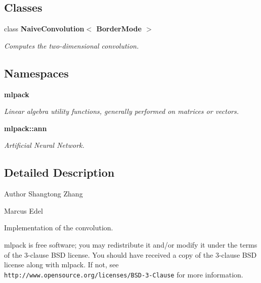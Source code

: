 \subsection*{Classes}
\begin{DoxyCompactItemize}
\item 
class \textbf{ Naive\+Convolution$<$ Border\+Mode $>$}
\begin{DoxyCompactList}\small\item\em Computes the two-\/dimensional convolution. \end{DoxyCompactList}\end{DoxyCompactItemize}
\subsection*{Namespaces}
\begin{DoxyCompactItemize}
\item 
 \textbf{ mlpack}
\begin{DoxyCompactList}\small\item\em Linear algebra utility functions, generally performed on matrices or vectors. \end{DoxyCompactList}\item 
 \textbf{ mlpack\+::ann}
\begin{DoxyCompactList}\small\item\em Artificial Neural Network. \end{DoxyCompactList}\end{DoxyCompactItemize}


\subsection{Detailed Description}
\begin{DoxyAuthor}{Author}
Shangtong Zhang 

Marcus Edel
\end{DoxyAuthor}
Implementation of the convolution.

mlpack is free software; you may redistribute it and/or modify it under the terms of the 3-\/clause B\+SD license. You should have received a copy of the 3-\/clause B\+SD license along with mlpack. If not, see {\tt http\+://www.\+opensource.\+org/licenses/\+B\+S\+D-\/3-\/\+Clause} for more information. 